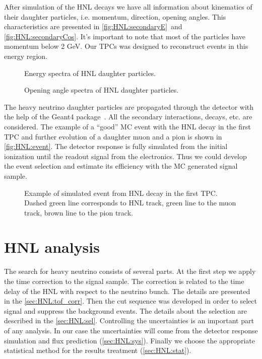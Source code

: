 \documentclass[../main.tex]{subfiles}
\begin{document}
After simulation of the HNL decays we have all information about kinematics of their daughter particles, i.e. momentum, direction, opening angles. This characteristics are presented in \autoref{fig:HNL:secondaryE}~and \autoref{fig:HNL:secondaryCos}. It's important to note that most of the particles have momentum below 2 GeV. Our TPCs was designed to reconstruct events in this energy region.
\begin{figure}[!ht]
\begin{center}
    \caption{Energy spectra of HNL daughter particles.}
    \label{fig:HNL:secondaryE}
\end{center}
\end{figure}
\begin{figure}[!ht]
\begin{center}
    \caption{Opening angle spectra of HNL daughter particles.}
    \label{fig:HNL:secondaryCos}
\end{center}
\end{figure}
The heavy neutrino daughter particles are propagated through the detector with the help of the Geant4 package~\cite{Agostinelli2003}. All the secondary interactions, decays, etc. are considered.
The example of a ``good'' MC event with the HNL decay in the first TPC and further evolution of a daughter muon and a pion is shown in \autoref{fig:HNL:event}. The detector response is fully simulated from the initial ionization until the readout signal from the electronics. Thus we could develop the event selection and estimate its efficiency with the MC generated signal sample.
\begin{figure}[!ht]
    \caption{Example of simulated event from HNL decay in the first TPC. Dashed green line corresponds to HNL track, green line to the muon track, brown line to the pion track.}
    \label{fig:HNL:event}
\end{figure}

\chapter{HNL analysis}
\label{ch:HNL:ana}
The search for heavy neutrino consists of several parts. At the first step we apply the time correction to the signal sample. The correction is related to the time delay of the HNL with respect to the neutrino bunch. The details are presented in the \autoref{sec:HNL:tof_corr}. Then the cut sequence was developed in order to select signal and suppress the background events. The details about the selection are described in the \autoref{sec:HNL:sel}. Controlling the uncertainties is an important part of any analysis. In our case the uncertainties will come from the detector response simulation and flux prediction (\autoref{sec:HNL:sys}). Finally we choose the appropriate statistical method for the results treatment (\autoref{sec:HNL:stat}).
\end{document}
